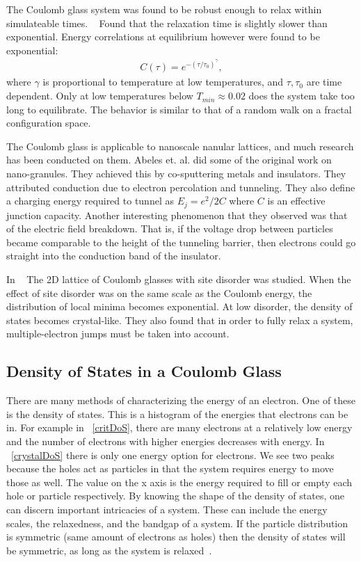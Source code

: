 The Coulomb glass system was found to be robust enough to relax within simulateable times. ~\cite{Kirkengen09} Found that the relaxation time is slightly slower than exponential. Energy correlations at equilibrium however were found to be exponential:
\begin{eqnarray}
C(\tau) = e^{-(\tau / \tau_0)^\gamma},
\label{correlations}
\end{eqnarray}
where $\gamma$ is proportional to temperature at low temperatures, and $\tau , \tau_0$ are time dependent. Only at low temperatures below $T_{min} \approx 0.02$ does the system take too long to equilibrate. The behavior is similar to that of a random walk on a fractal configuration space. 

The Coulomb glass is applicable to nanoscale nanular lattices, and much research has been conducted on them. Abeles et. al. did some of the original work on nano-granules. They achieved this by co-sputtering metals and insulators. They attributed conduction due to electron percolation and tunneling. They also define a charging energy required to tunnel as $E_j = e^2/2C$ where $C$ is an effective junction capacity. Another interesting phenomenon that they observed was that of the electric field breakdown. That is, if the voltage drop between particles became comparable to the height of the tunneling barrier, then electrons could go straight into the conduction band of the insulator. 

In ~\cite{Vinokur08} The 2D lattice of Coulomb glasses with site disorder was studied. When the effect of site disorder was on the same scale as the Coulomb energy, the distribution of local minima becomes exponential. At low disorder, the density of states becomes crystal-like. They also found that in order to fully relax a system, multiple-electron jumps must be taken into account. 

\subsection{Density of States in a Coulomb Glass}
There are many methods of characterizing the energy of an electron. One of these is the density of states. This is a histogram of the energies that electrons can be in. For example in ~\ref{critDoS}, there are many electrons at a relatively low energy and the number of electrons with higher energies decreases with energy. In ~\ref{crystalDoS} there is only one energy option for electrons. We see two peaks because the holes act as particles in that the system requires energy to move those as well. The value on the x axis is the energy required to fill or empty each hole or particle respectively. By knowing the shape of the density of states, one can discern important intricacies of a system. These can include the energy scales, the relaxedness, and the bandgap of a system. If the particle distribution is symmetric (same amount of electrons as holes) then the density of states will be symmetric, as long as the system is relaxed~\cite{Kittel96}.


